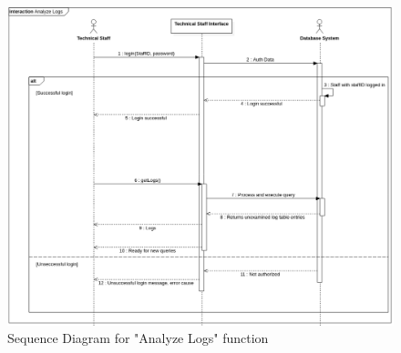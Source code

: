 \begin{figure}[H]
    \centering
    \includegraphics[width=0.99\linewidth]{content/specificRequirements/img/SequenceDiagramAnalyzeLogs.png}
    \caption{Sequence Diagram for "Analyze Logs" function}
    \label{fig:seq_diagram_analyze_logs}
\end{figure}
 
